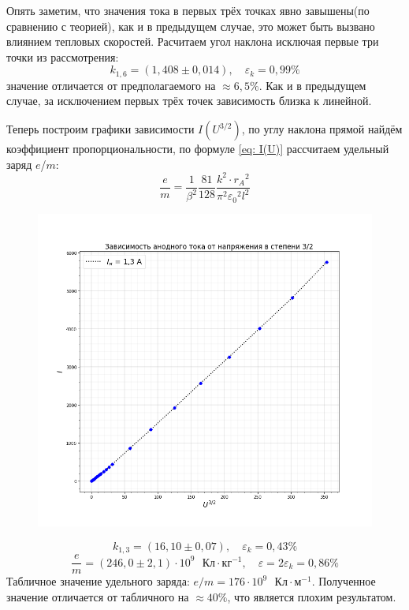 \documentclass[a4paper,12pt]{article}
\begin{document}
Опять заметим, что значения тока в первых трёх точках явно завышены(по сравнению с теорией), как и в предыдущем случае, это может быть вызвано влиянием тепловых скоростей. Расчитаем угол наклона исключая первые три точки из рассмотрения:
\[k_{1,6} = (1,408 \pm 0,014), \quad \varepsilon_k = 0,99\% \]
значение отличается от предполагаемого на $\approx 6,5 \%$. Как и в предыдущем случае, за исключением первых трёх точек зависимость близка к линейной.

Теперь построим графики зависимости $I(U^{3/2})$, по углу наклона прямой найдём коэффициент пропорциональности, по формуле \eqref{eq: I(U)} рассчитаем удельный заряд $e$/$m$:
\[\frac{e}{m} = \frac{1}{\beta^2}\frac{81}{128}\frac{k^2\cdot {r_A}^2}{{\pi}^2{\varepsilon_0}^2 l^2}\]


\begin{figure}[H]\label{fig: I)(U^3/2) 1.3}
    \centering
    \includegraphics[width = \textwidth]{I(U pow (1,5))_13.png}
\end{figure}
\[k_{1,3} = (16,10 \pm 0,07), \quad \varepsilon_k = 0,43\% \]
\[\frac{e}{m} = (246,0 \pm 2,1) \cdot 10^{9} \text{ } Кл \cdot кг^{-1}, \quad \varepsilon = 2\varepsilon_k = 0,86\%\]
Табличное значение удельного заряда: $e / m = 176\cdot 10^{9} \text{ } Кл \cdot м^{-1}$.
Полученное значение отличается от табличного на $\approx 40\%$, что является плохим результатом. 
\end{document}
